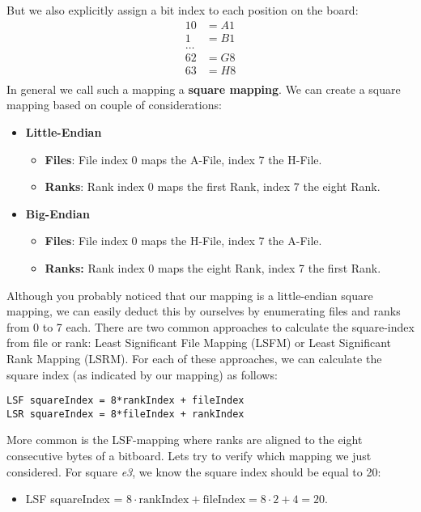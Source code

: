 %
But we also explicitly assign a bit index to each position on the board:
%
\begin{alignat*}{1}
0 &= A1\\
1 &= B1\\
\dots\\
62 &= G8\\
63 &= H8\\
\end{alignat*}
%
In general we call such a mapping a \textbf{square mapping}.
We can create a square mapping based on couple of considerations:
%
\begin{itemize}
	\item \textbf{Little-Endian}
	\begin{itemize}
		\item \textbf{Files}: File index 0 maps the A-File, index 7 the H-File.
		\item \textbf{Ranks}: Rank index 0 maps the first Rank, index 7 the eight Rank.
	\end{itemize}
	\item \textbf{Big-Endian}
	\begin{itemize}
		\item \textbf{Files}: File index 0 maps the H-File, index 7 the A-File.
		\item \textbf{Ranks:} Rank index 0 maps the eight Rank, index 7 the first Rank.
	\end{itemize}
\end{itemize}
%
Although you probably noticed that our mapping is a little-endian square mapping,
we can easily deduct this by ourselves by enumerating files and ranks from 0 to 7 each.
There are two common approaches to calculate the square-index from file or rank:
Least Significant File Mapping (LSFM) or Least Significant Rank Mapping (LSRM).
For each of these approaches, we can calculate the square index (as indicated by our mapping) as follows:
%
\begin{verbatim}
LSF squareIndex = 8*rankIndex + fileIndex
LSR squareIndex = 8*fileIndex + rankIndex
\end{verbatim}
%
More common is the LSF-mapping where ranks are aligned to the eight consecutive bytes of a bitboard.
Lets try to verify which mapping we just considered. For square \textit{e3}, we know the square index should be equal to 20:
%
\begin{itemize}
	\item LSF squareIndex = $8\cdot \text{rankIndex} + \text{fileIndex} = 8 \cdot 2 + 4 = 20$.
\end{itemize}
